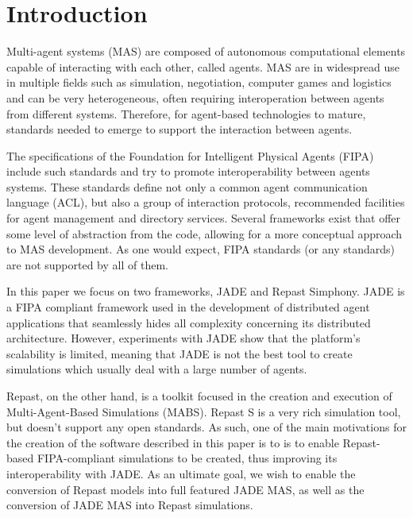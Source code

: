 \section{Introduction} %
\label{sec:introduction}

Multi-agent systems (MAS) are composed of autonomous computational elements capable of interacting with each other, called agents. \cite{wooldridge2008introduction} MAS are in widespread use in multiple fields such as simulation, negotiation, computer games and logistics and can be very heterogeneous, often requiring interoperation between agents from different systems. \cite{wooldridge2008introduction} Therefore, for agent-based technologies to mature, standards needed to emerge to support the interaction between agents.

The specifications of the Foundation for Intelligent Physical Agents (FIPA) include such standards and try to promote interoperability between agents systems. These standards define not only a common agent communication language (ACL), but also a group of interaction protocols, recommended facilities for agent management and directory services. \cite{o1998fipa} Several frameworks exist that offer some level of abstraction from the code, allowing for a more conceptual approach to MAS development. As one would expect, FIPA standards (or any standards) are not supported by all of them. \cite{gormer2011jrep}

In this paper we focus on two frameworks, JADE and Repast Simphony. JADE is a FIPA compliant framework used in the development of distributed agent applications that seamlessly hides all complexity concerning its distributed architecture. \cite{bellifemine2003jade} However, experiments with JADE show that the platform's scalability is limited, meaning that JADE is not the best tool to create simulations which usually deal with a large number of agents. \cite{mengistu2008scalability} \cite{garcia2011misia}

Repast, on the other hand, is a toolkit focused in the creation and execution of Multi-Agent-Based Simulations (MABS). Repast S is a very rich simulation tool, but doesn't support any open standards. \cite{collier2003repast} As such, one of the main motivations for the creation of the software described in this paper is to is to enable Repast-based FIPA-compliant simulations to be created, thus improving its interoperability with JADE. As an ultimate goal, we wish to enable the conversion of Repast models into full featured JADE MAS, as well as the conversion of JADE MAS into Repast simulations.

